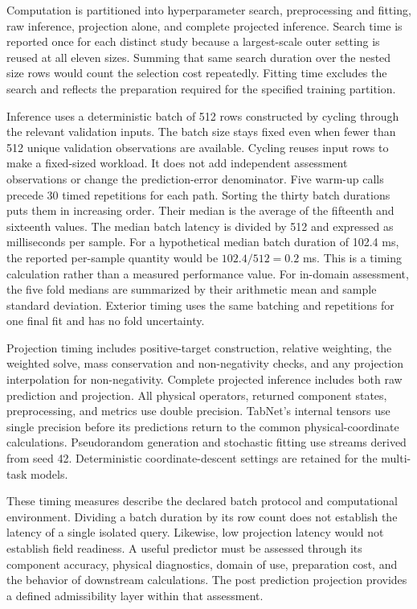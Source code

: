 Computation is partitioned into hyperparameter search, preprocessing and fitting, raw inference, projection alone, and complete projected inference. Search time is reported once for each distinct study because a largest-scale outer setting is reused at all eleven sizes. Summing that same search duration over the nested size rows would count the selection cost repeatedly. Fitting time excludes the search and reflects the preparation required for the specified training partition.

Inference uses a deterministic batch of 512 rows constructed by cycling through the relevant validation inputs. The batch size stays fixed even when fewer than 512 unique validation observations are available. Cycling reuses input rows to make a fixed-sized workload. It does not add independent assessment observations or change the prediction-error denominator. Five warm-up calls precede 30 timed repetitions for each path. Sorting the thirty batch durations puts them in increasing order. Their median is the average of the fifteenth and sixteenth values. The median batch latency is divided by 512 and expressed as milliseconds per sample. For a hypothetical median batch duration of 102.4 ms, the reported per-sample quantity would be $102.4/512=0.2$ ms. This is a timing calculation rather than a measured performance value. For in-domain assessment, the five fold medians are summarized by their arithmetic mean and sample standard deviation. Exterior timing uses the same batching and repetitions for one final fit and has no fold uncertainty.

Projection timing includes positive-target construction, relative weighting, the weighted solve, mass conservation and non-negativity checks, and any projection interpolation for non-negativity. Complete projected inference includes both raw prediction and projection. All physical operators, returned component states, preprocessing, and metrics use double precision. TabNet's internal tensors use single precision before its predictions return to the common physical-coordinate calculations. Pseudorandom generation and stochastic fitting use streams derived from seed 42. Deterministic coordinate-descent settings are retained for the multi-task models.

These timing measures describe the declared batch protocol and computational environment. Dividing a batch duration by its row count does not establish the latency of a single isolated query. Likewise, low projection latency would not establish field readiness. A useful predictor must be assessed through its component accuracy, physical diagnostics, domain of use, preparation cost, and the behavior of downstream calculations. The post prediction projection provides a defined admissibility layer within that assessment.

